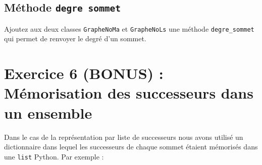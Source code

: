 \documentclass[12pt]{book}
\begin{document}
\subsection{Méthode \texttt{degre sommet}}

\Quest Ajoutez aux deux classes \texttt{GrapheNoMa} et
\texttt{GrapheNoLs} une méthode \texttt{degre\_sommet} qui permet de
renvoyer le degré d'un sommet.


\section{Exercice 6 (BONUS) : Mémorisation des successeurs dans un ensemble}\label{exercice-7-bonus-muxe9morisation-des-successeurs-dans-un-ensemble}

Dans le cas de la représentation par liste de successeurs nous avons
utilisé un dictionnaire dans lequel les successeurs de chaque sommet
étaient mémorisés dans une \texttt{list} Python. Par exemple :
\end{document}
